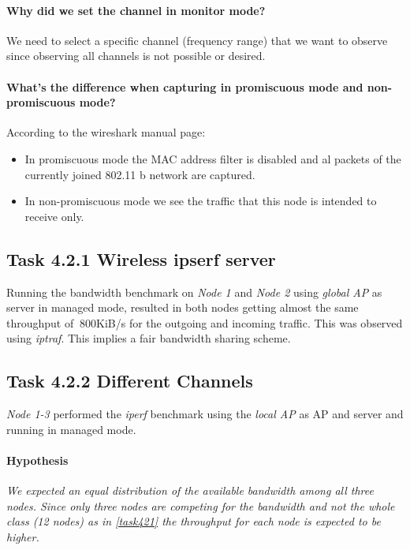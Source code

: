 \documentclass[12pt,a4paper]{article}
\begin{document}
\paragraph{Why did we set the channel in monitor mode?}
We need to select a specific channel (frequency range) that we want to observe since observing all channels is not possible or desired.

\paragraph{What's the difference when capturing in promiscuous mode and non-promiscuous mode?}
According to the wireshark manual page\cite{wireshark:man}:
\begin{itemize}
	\item In promiscuous mode the MAC address filter is disabled and al packets of the currently joined 802.11 b network are captured.

	\item In non-promiscuous mode we see the traffic that this node is intended to receive only.

\end{itemize}

\subsection{Task 4.2.1 Wireless ipserf server}\label{task421}
Running the bandwidth benchmark on \emph{Node 1} and \emph{Node 2 }using \emph{global AP} as server in managed mode, resulted in both nodes getting almost the same throughput of $~800$KiB/s for the outgoing and incoming traffic. This was observed using \emph{iptraf}.
This implies a fair bandwidth sharing scheme.

\subsection{Task 4.2.2 Different Channels}\label{task422}
\emph{Node 1-3} performed the \emph{iperf} benchmark using the \emph{local AP} as AP and server and running in managed mode.
\paragraph{Hypothesis}
\textit{We expected an equal distribution of the available bandwidth among all three nodes. Since only three nodes are competing for the bandwidth and not the whole class (12 nodes) as in \autoref{task421} the throughput for each node is expected to be higher.}
\end{document}
